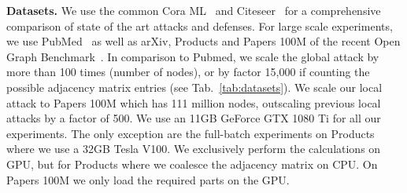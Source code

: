 \documentclass[sigconf, review]{acmart}
\begin{document}

\begin{table}[b]
  \centering
  \caption{Statistics of the used datasets. For the dense adjacency matrix we assume that each element is represented by 4 bytes. In the sparse case we use two 8 byte integer pointers and a 4 bytes float value.}
  \label{tab:datasets}
\end{table}


\textbf{Datasets.} We use the common Cora ML~\citep{Bojchevski2018} and Citeseer~\citep{McCallum2000} for a comprehensive comparison of state of the art attacks and defenses. For large scale experiments, we use PubMed~\citep{Sen2008} as well as arXiv, Products and Papers 100M of the recent Open Graph Benchmark~\citep{Hu2020}. In comparison to Pubmed, we scale the global attack by more than 100 times (number of nodes), or by factor 15,000 if counting the possible adjacency matrix entries (see Tab.~\ref{tab:datasets}).
We scale our local attack to Papers 100M which has 111 million nodes, outscaling previous local attacks by a factor of 500.
We use an 11GB GeForce GTX 1080 Ti for all our experiments. The only exception are the full-batch experiments on Products where we use a 32GB Tesla V100. We exclusively perform the calculations on GPU, but for Products where we coalesce the adjacency matrix on CPU. On Papers 100M we only load the required parts on the GPU.
\end{document}
